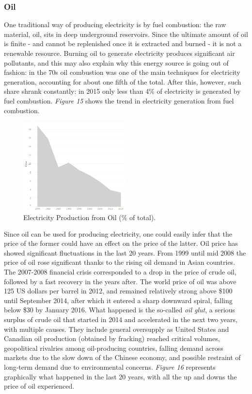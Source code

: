 \documentclass{book}
\begin{document}
\subsubsection*{Oil}

One traditional way of producing electricity is by fuel combustion: the raw material, oil, sits in deep underground reservoirs. Since the ultimate amount of oil is finite - and cannot be replenished once it is extracted and burned - it is not a renewable resource. Burning oil to generate electricity produces significant air pollutants, and this may also explain why this energy source is going out of fashion: in the 70s oil combustion was one of the main techniques for electricity generation, accounting for about one fifth of the total. After this, however, such share shrank constantly: in 2015 only less than 4\% of electricity is generated by fuel combustion. \textit{Figure 15} shows the trend in electricity generation from fuel combustion.

\bigskip
\begin{figure}[H]
\begin{center}
\captionsetup{justification=centering}
\includegraphics[width=0.5\textwidth]{Images/oil.png}
\caption{Electricity Production from Oil (\% of total). }
\end{center}
\end{figure}
\bigskip
 
Since oil can be used for producing electricity, one could easily infer that the price of the former could have an effect on the price of the latter. Oil price has showed significant fluctuations in the last 20 years. From 1999 until mid 2008 the price of oil rose significant thanks to the rising oil demand in Asian countries. The 2007-2008 financial crisis corresponded to a drop in the price of crude oil, followed by a fast recovery in the years after. The world price of oil was above 125 US dollars per barrel in 2012, and remained relatively strong above \$100 until September 2014, after which it entered a sharp downward spiral, falling below \$30 by January 2016. What happened is the so-called \textit{oil glut}, a serious surplus of crude oil that started in 2014 and accelerated in the next two years, with multiple causes. They include general oversupply as United States and Canadian oil production (obtained by fracking) reached critical volumes, geopolitical rivalries among oil-producing countries, falling demand across markets due to the slow down of the Chinese economy, and possible restraint of long-term demand due to environmental concerns. \textit{Figure 16} represents graphically what happened in the last 20 years, with all the up and downs the price of oil experienced.
\end{document}
